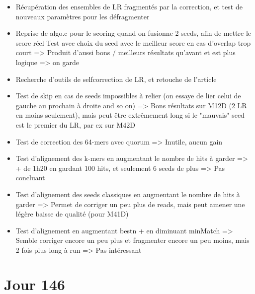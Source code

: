 \documentclass[12pt]{report}
\begin{document}
\begin{itemize}
	\item Récupération des ensembles de LR fragmentés par la correction, et test de nouveaux paramètres pour les défragmenter
	
	\item Reprise de algo.c pour le scoring quand on fusionne 2 seeds, afin de mettre le score réel
		  Test avec choix du seed avec le meilleur score en cas d'overlap trop court => Produit d'aussi bons / meilleurs résultats qu'avant
		  et est plus logique => on garde
		  
	\item Recherche d'outils de selfcorrection de LR, et retouche de l'article
	
	\item Test de skip en cas de seeds impossibles à relier (on essaye de lier celui de gauche au prochain à droite and so on)
		  => Bons résultats sur M12D (2 LR en moins seulement), mais peut être extrêmement long
		  si le "mauvais" seed est le premier du LR, par ex sur M42D
		  
	\item Test de correction des 64-mers avec quorum => Inutile, aucun gain
	
	\item Test d'alignement des k-mers en augmentant le nombre de hits à garder => + de 1h20 en gardant 100 hits, et seulement
		  6 seeds de plus => Pas concluant
		  
	\item Test d'alignement des seeds classiques en augmentant le nombre de hits à garder => Permet de corriger un peu plus de reads,
		  mais peut amener une légère baisse de qualité (pour M41D)
		  
	\item Test d'alignement en augmentant bestn + en diminuant minMatch => Semble corriger encore un peu plus et fragmenter encore un peu moins,
		  mais 2 fois plus long à run => Pas intéressant
\end{itemize}

\section{Jour 146}
\end{document}
